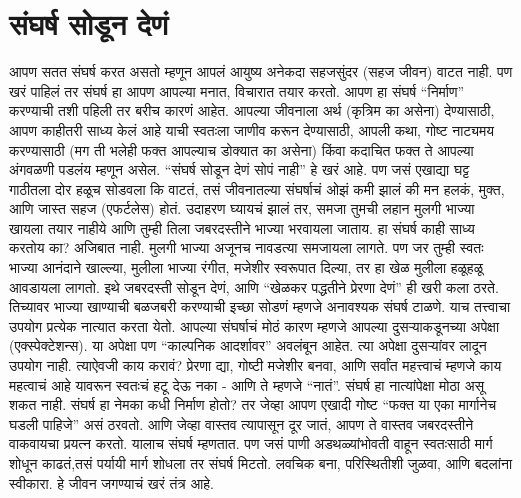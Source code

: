  \chapter{संघर्ष सोडून देणं}
आपण सतत संघर्ष करत असतो म्हणून आपलं आयुष्य अनेकदा सहजसुंदर (सहज जीवन) वाटत नाही. पण खरं पाहिलं तर संघर्ष हा आपण आपल्या मनात, विचारात तयार करतो.
आपण हा संघर्ष “निर्माण” करण्याची तशी पहिली तर बरीच कारणं आहेत. आपल्या जीवनाला अर्थ (कृत्रिम का असेना) देण्यासाठी, आपण काहीतरी साध्य केलं आहे याची स्वतःला जाणीव करून देण्यासाठी, आपली कथा, गोष्ट नाट्यमय करण्यासाठी (मग ती भलेही फक्त आपल्याच डोक्यात का असेना) किंवा कदाचित फक्त ते आपल्या अंगवळणी पडलंय म्हणून असेल.
“संघर्ष सोडून देणं सोपं नाही” हे खरं आहे. पण जसं एखाद्या घट्ट गाठीतला दोर हळूच सोडवला कि वाटतं, तसं जीवनातल्या संघर्षाचं ओझं कमी झालं की मन हलकं, मुक्त, आणि जास्त सहज (एफर्टलेस) होतं.
उदाहरण घ्यायचं झालं तर, समजा तुमची लहान मुलगी भाज्या खायला तयार नाहीये आणि तुम्ही तिला जबरदस्तीने भाज्या भरवायला जाताय. हा संघर्ष काही साध्य करतोय का? अजिबात नाही. मुलगी भाज्या अजूनच नावडत्या समजायला लागते. पण जर तुम्ही स्वतः भाज्या आनंदाने खाल्ल्या, मुलीला भाज्या रंगीत, मजेशीर स्वरूपात दिल्या, तर हा खेळ मुलीला हळूहळू आवडायला लागतो. इथे जबरदस्ती सोडून देणं, आणि “खेळकर पद्धतीने प्रेरणा देणं”  ही खरी कला ठरते. तिच्यावर भाज्या खाण्याची बळजबरी करण्याची इच्छा सोडणं म्हणजे अनावश्यक संघर्ष टाळणे.
याच तत्त्वाचा उपयोग प्रत्येक नात्यात करता येतो. आपल्या संघर्षाचं मोठं कारण म्हणजे आपल्या दुसऱ्याकडूनच्या अपेक्षा (एक्स्पेक्टेशन्स). या अपेक्षा पण “काल्पनिक आदर्शावर” अवलंबून आहेत. त्या अपेक्षा दुसऱ्यांवर लादून उपयोग नाही. त्याऐवजी काय करावं? प्रेरणा द्या, गोष्टी मजेशीर बनवा, आणि सर्वांत महत्त्वाचं म्हणजे काय महत्वाचं आहे यावरून स्वतःचं हटू देऊ नका - आणि ते म्हणजे “नातं”. संघर्ष हा नात्यांपेक्षा मोठा असू शकत नाही.
संघर्ष हा नेमका कधी निर्माण होतो? तर जेव्हा आपण एखादी गोष्ट “फक्त या एका मार्गानेच घडली पाहिजे” असं ठरवतो. आणि जेव्हा वास्तव त्यापासून दूर जातं, आपण ते वास्तव जबरदस्तीने वाकवायचा प्रयत्न करतो. यालाच संघर्ष म्हणतात. पण जसं पाणी अडथळ्यांभोवती वाहून स्वतःसाठी मार्ग शोधून काढतं,तसं पर्यायी मार्ग शोधला तर संघर्ष मिटतो. लवचिक बना, परिस्थितीशी जुळवा, आणि बदलांना स्वीकारा. हे जीवन जगण्याचं खरं तंत्र आहे.
